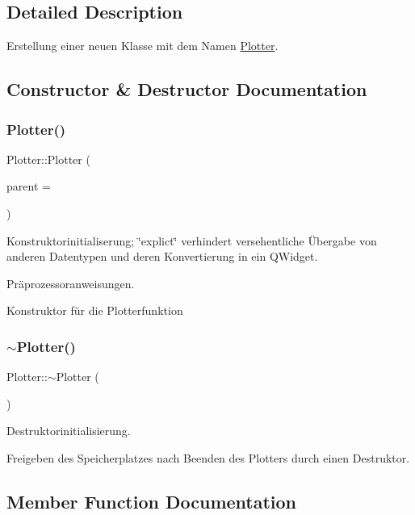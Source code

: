 \subsection{Detailed Description}
Erstellung einer neuen Klasse mit dem Namen \hyperlink{class_plotter}{Plotter}. 

\subsection{Constructor \& Destructor Documentation}
\mbox{\label{class_plotter_a367b6890c36910a27ec710ac3693e64b}} 
\subsubsection{\texorpdfstring{Plotter()}{Plotter()}}
{\footnotesize\ttfamily Plotter\+::\+Plotter (\begin{DoxyParamCaption}\item[{Q\+Widget $\ast$}]{parent = {} }\end{DoxyParamCaption})\hspace{0.3cm}{\ttfamily [explicit]}}



Konstruktorinitialiserung; \char`\"{}explict\char`\"{} verhindert versehentliche Übergabe von anderen Datentypen und deren Konvertierung in ein Q\+Widget. 

Präprozessoranweisungen.

Konstruktor für die Plotterfunktion \mbox{\label{class_plotter_acd0883f9597a6b3bfcca0fce926809a0}} 
\subsubsection{\texorpdfstring{$\sim$\+Plotter()}{~Plotter()}}
{\footnotesize\ttfamily Plotter\+::$\sim$\+Plotter (\begin{DoxyParamCaption}{ }\end{DoxyParamCaption})}



Destruktorinitialisierung. 

Freigeben des Speicherplatzes nach Beenden des Plotters durch einen Destruktor. 

\subsection{Member Function Documentation}
\mbox{\label{class_plotter_a7169eca3c8b2e1a270dbf720af572410}} 

